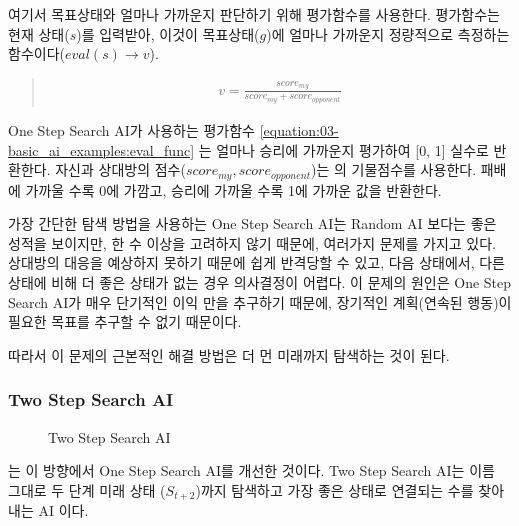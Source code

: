 \documentclass[letterpaper,10pt,english]{sphinxmanual}
\begin{document}
여기서 목표상태와 얼마나 가까운지 판단하기 위해 평가함수를 사용한다.
평가함수는 현재 상태(\(s\))를 입력받아, 이것이 목표상태(\(g\))에 얼마나 가까운지 정량적으로
측정하는 함수이다(\(eval(s) \rightarrow v\)).
\begin{quote}
\begin{equation}\label{equation:03-basic_ai_examples:eval_func}
\begin{split}v = \frac{{score}_{my}}{{score}_{my} + {score}_{opponent}}\end{split}
\end{equation}\end{quote}

One Step Search AI가 사용하는 평가함수 \eqref{equation:03-basic_ai_examples:eval_func} 는 얼마나 승리에 가까운지 평가하여 {[}0, 1{]} 실수로 반환한다.
자신과 상대방의 점수(\({score}_{my}, {score}_{opponent}\))는 {\hyperref[\detokenize{01-microchess_ai_competition:score-table}]{}} 의 기물점수를 사용한다.
패배에 가까울 수록 0에 가깜고, 승리에 가까울 수록 1에 가까운 값을 반환한다.

가장 간단한 탐색 방법을 사용하는 One Step Search AI는 Random AI 보다는 좋은 성적을 보이지만,
한 수 이상을 고려하지 않기 때문에, 여러가지 문제를 가지고 있다.
상대방의 대응을 예상하지 못하기 때문에 쉽게 반격당할 수 있고,
다음 상태에서, 다른 상태에 비해 더 좋은 상태가 없는 경우 의사결정이 어렵다.
이 문제의 원인은 One Step Search AI가 매우 단기적인 이익 만을 추구하기 때문에,
장기적인 계획(연속된 행동)이 필요한 목표를 추구할 수 없기 때문이다.

따라서 이 문제의 근본적인 해결 방법은 더 먼 미래까지 탐색하는 것이 된다.


\subsubsection{Two Step Search AI}
\label{\detokenize{03-basic_ai_examples:two-step-search-ai}}
\begin{figure}[htbp]
\centering
\capstart

\noindent{}
\caption{Two Step Search AI}\label{\detokenize{03-basic_ai_examples:id3}}\label{\detokenize{03-basic_ai_examples:id31}}\end{figure}

{\hyperref[\detokenize{03-basic_ai_examples:id3}]{}} 는 이 방향에서 One Step Search AI를 개선한 것이다. Two Step Search AI는 이름 그대로
두 단계 미래 상태 (\(S_{t+2}\))까지 탐색하고 가장 좋은 상태로 연결되는 수를 찾아내는 AI 이다.
\end{document}
